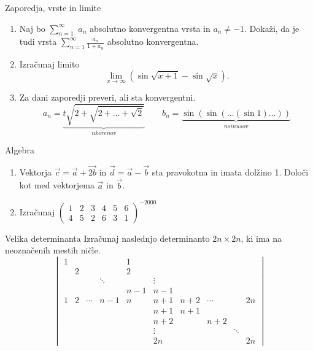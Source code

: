 \begin{frame}{Zaporedja, vrste in limite}
	\begin{enumerate}
		\item 
		Naj bo $\sum_{n=1}^{\infty}$ $a_n$ absolutno konvergentna vrsta in $a_n \ne -1$.
		Dokaži, da je tudi vrsta $\sum_{n=1}^\infty \frac{a_n}{1+a_n}$
		absolutno konvergentna.

		\item
		Izračunaj limito
		$$ \lim_{x\to\infty } (\sin\sqrt{x+1} -\sin\sqrt{x}). $$

		\item
		Za dani zaporedji preveri, ali sta konvergentni.
		$$
		 a_n = \underbrace{t\sqrt{2+\sqrt{2+\dots+\sqrt{2}}}}_{n korenov} \qquad
		 b_n = \underbrace{\sin(\sin(\dots(\sin 1)\dots))}_{n sinusov}
		$$
		
	\end{enumerate}
\end{frame}

\begin{frame}{Algebra}
	\begin{enumerate}
		\item
		Vektorja $\vec{c}= \vec{a} + \vec{2b}$ in $\vec{d}= \vec{a}-\vec{b}$
		sta pravokotna in imata dolžino 1. Določi kot med vektorjema $\vec{a}$ in $\vec{b}$.
		\item 
		Izračunaj $
		{\begin{pmatrix}
			1 & 2 & 3 & 4 & 5 & 6\\
            4 & 5 & 2 & 6 & 3 & 1
		\end{pmatrix}}^{-2000} $
		
	\end{enumerate}
\end{frame}

\begin{frame}{Velika determinanta}     %
	Izračunaj naslednjo determinanto $2n \times 2n$, ki ima na neoznačenih mestih ničle.
	$$\begin{vmatrix}
		1 &  & & & 1& & & & \\
		&  2 & & & 2 & & & &    \\
		& & & \ddots & & \vdots & & & &     \\
		& & & & n-1 & n-1 & & & &     \\
		1 & 2 & \cdots & n-1& n & n+1& n+2& \cdots  & & 2n      \\
		& & & & & n+1 & n+1 & & &     \\
		& & & & & n+2 & & n+2 & &     \\
		& & & & & \vdots& & & \ddots &     \\
		& & & & & 2n & & & & 2n     
    \end{vmatrix}$$
\end{frame}

